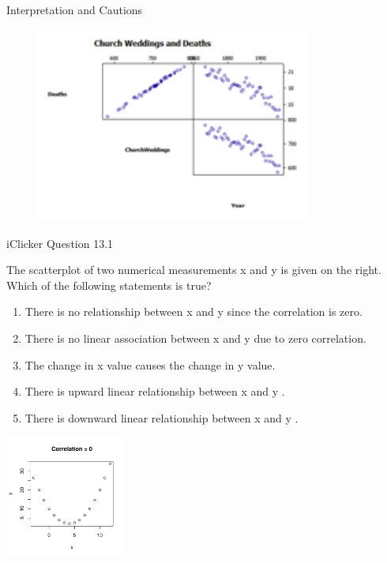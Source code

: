 \documentclass[14pt]{beamer}\usepackage[]{graphicx}\usepackage[]{color}
\begin{document}
\begin{frame}[fragile]{Interpretation and Cautions}

\begin{figure}[htbp]
   \centering
   \includegraphics[width=9cm]{chapters/chapter13/figure/fig1.png} %
\end{figure}

\end{frame}

\begin{frame}[fragile]{iClicker Question 13.1}

{\small{
The scatterplot of two numerical measurements x  and y is given on the right. Which of the following  statements is true?
}}

\vspace{3mm}

\begin{minipage}[ht]{6cm}

{\footnotesize{
\begin{enumerate}
\item There is no relationship between x and y since the correlation is zero.
\item There is no linear association  between x and y due to zero  correlation.
\item The change in x value causes the  change in y value.
\item There is upward linear relationship  between x and y .
\item There is downward linear relationship  between x and y .
\end{enumerate}
}}
\end{minipage} \hfill
\begin{minipage}[ht]{4cm}



\includegraphics[width=4cm]{figure/LBL13a-1} 

\end{minipage}
\end{frame}
\end{document}
